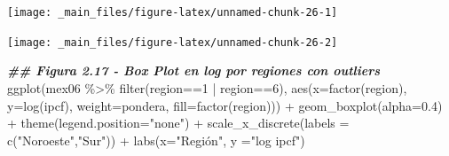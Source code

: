 \documentclass[
]{book}
\newenvironment{Shaded}{\begin{snugshade}}{\end{snugshade}}
\newcommand{\AttributeTok}[1]{\textcolor[rgb]{0.77,0.63,0.00}{#1}}
\newcommand{\CommentTok}[1]{\textcolor[rgb]{0.56,0.35,0.01}{\textit{#1}}}
\newcommand{\ConstantTok}[1]{\textcolor[rgb]{0.00,0.00,0.00}{#1}}
\newcommand{\DecValTok}[1]{\textcolor[rgb]{0.00,0.00,0.81}{#1}}
\newcommand{\DocumentationTok}[1]{\textcolor[rgb]{0.56,0.35,0.01}{\textbf{\textit{#1}}}}
\newcommand{\FloatTok}[1]{\textcolor[rgb]{0.00,0.00,0.81}{#1}}
\newcommand{\FunctionTok}[1]{\textcolor[rgb]{0.00,0.00,0.00}{#1}}
\newcommand{\NormalTok}[1]{#1}
\newcommand{\SpecialCharTok}[1]{\textcolor[rgb]{0.00,0.00,0.00}{#1}}
\newcommand{\StringTok}[1]{\textcolor[rgb]{0.31,0.60,0.02}{#1}}
\begin{document}
\begin{Shaded}
\end{Shaded}

\texttt{[image: \_main\_files/figure-latex/unnamed-chunk-26-1]}

\begin{Shaded}
\end{Shaded}

\texttt{[image: \_main\_files/figure-latex/unnamed-chunk-26-2]}

\begin{Shaded}
\begin{Highlighting}[]
\DocumentationTok{\#\# Figura 2.17  {-} Box Plot en log por regiones con outliers}
\FunctionTok{ggplot}\NormalTok{(mex06 }\SpecialCharTok{\%\textgreater{}\%} \FunctionTok{filter}\NormalTok{(region}\SpecialCharTok{==}\DecValTok{1} \SpecialCharTok{|}\NormalTok{ region}\SpecialCharTok{==}\DecValTok{6}\NormalTok{), }
       \FunctionTok{aes}\NormalTok{(}\AttributeTok{x=}\FunctionTok{factor}\NormalTok{(region), }\AttributeTok{y=}\FunctionTok{log}\NormalTok{(ipcf), }\AttributeTok{weight=}\NormalTok{pondera, }\AttributeTok{fill=}\FunctionTok{factor}\NormalTok{(region))) }\SpecialCharTok{+} 
  \FunctionTok{geom\_boxplot}\NormalTok{(}\AttributeTok{alpha=}\FloatTok{0.4}\NormalTok{) }\SpecialCharTok{+}
  \FunctionTok{theme}\NormalTok{(}\AttributeTok{legend.position=}\StringTok{"none"}\NormalTok{) }\SpecialCharTok{+} 
  \FunctionTok{scale\_x\_discrete}\NormalTok{(}\AttributeTok{labels =} \FunctionTok{c}\NormalTok{(}\StringTok{"Noroeste"}\NormalTok{,}\StringTok{"Sur"}\NormalTok{)) }\SpecialCharTok{+}
  \FunctionTok{labs}\NormalTok{(}\AttributeTok{x=}\StringTok{"Región"}\NormalTok{, }\AttributeTok{y =}\StringTok{"log ipcf"}\NormalTok{)}
\end{Highlighting}
\end{Shaded}
\end{document}
